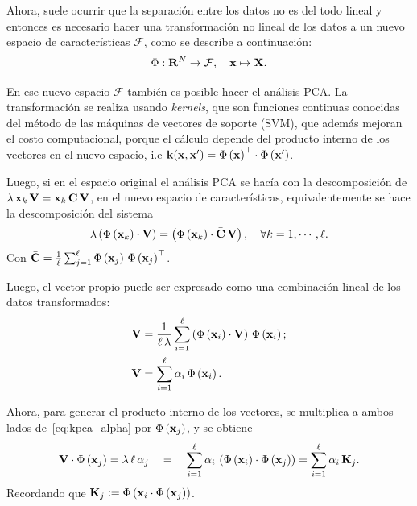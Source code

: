Ahora, suele ocurrir que la separación entre los datos no es del todo lineal y entonces es necesario hacer una transformación no lineal de los datos a un nuevo espacio de características $\mathcal{F}$, como se describe a continuación:
%
\begin{equation}
    \label{eq:kpca_non-linear_mapping}
    \Phi: \vect{R}^N \to \mathcal{F}, \quad \vect{x} \mapsto \vect{X}.
\end{equation}

En ese nuevo espacio $\mathcal{F}$ también es posible hacer el análisis PCA. La transformación se realiza usando \emph{kernels}, que son funciones continuas conocidas del método de las máquinas de vectores de soporte (SVM), que además mejoran el costo computacional, porque el cálculo depende del producto interno de los vectores en el nuevo espacio, i.e $\mathrm{\mathbf{k}}(\mathrm{\mathbf{x}}, \mathrm{\mathbf{x}}') = \Phi\left(\mathrm{\mathbf{x}}\right)^\top\cdot\Phi\left(\mathrm{\mathbf{x'}}\right)$.

Luego, si en el espacio original el análisis PCA se hacía con la descomposición de $\lambda\,\mathrm{\mathbf{x}}_k\,\mathrm{\mathbf{V}} = \mathrm{\mathbf{x}}_k\,\mathrm{\mathbf{C}}\,\mathrm{\mathbf{V}}$, en el nuevo espacio de características, equivalentemente se hace la descomposición del sistema
%
\begin{equation}
    \label{eq:kpca_eigendecomposition}
    \lambda\left(\Phi\left(\vect{x}_k\right)\cdot\vect{V}\right) =
    \left(\Phi\left(\vect{x}_k\right)\cdot\bar{\vect{C}}\,\vect{V}\right), \quad \forall k = 1, \cdots, \ell.
\end{equation}
%
Con $\bar{\mathrm{\mathbf{C}}} = \frac{1}{\ell}\sum_{j = 1}^\ell \Phi\left(\mathrm{\mathbf{x}}_j\right)\,\Phi\left(\mathrm{\mathbf{x}}_j\right)^\top$.

Luego, el vector propio puede ser expresado como una combinación lineal de los datos transformados:
%
\begin{subequations}
    \begin{align}
        \vect{V} &= \frac{1}{\ell\,\lambda} \sum_{i = 1}^\ell \left(
        \Phi\left(\vect{x}_i\right)\cdot\vect{V}\right)\,\Phi\left(\vect{x}_i\right); \\
        \vect{V} &= \sum_{i = 1}^\ell \alpha_i\,\Phi\left(\vect{x}_i\right). \label{eq:kpca_alpha}
    \end{align}
\end{subequations}

Ahora, para generar el producto interno de los vectores, se multiplica a ambos lados de~\eqref{eq:kpca_alpha} por $\Phi\left(\mathrm{\mathbf{x}}_j\right)$, y se obtiene
%
\begin{equation}
    \label{eq:kpca_internal_product}
    \vect{V}\cdot\Phi\left(\vect{x}_j\right) = \lambda\,\ell\,\alpha_j
    \quad = \quad \sum_{i = 1}^\ell \alpha_i\,\left(\Phi\left(\vect{x}_i\right)\cdot\Phi\left(\vect{x}_j\right)\right)
    = \sum_{i = 1}^\ell \alpha_i\,\vect{K}_j.
\end{equation}
%
Recordando que $\mathrm{\mathbf{K}}_j \vcentcolon=  \Phi\left(\mathrm{\mathbf{x}}_i\cdot\Phi\left(\mathrm{\mathbf{x}}_j\right)\right)$.

